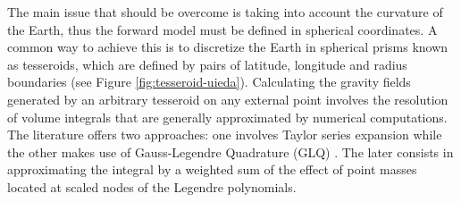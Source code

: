 \documentclass[a4paper,10pt]{article}
\begin{document}
The main issue that should be overcome is taking into account the curvature of the Earth, thus the forward model must be defined in spherical coordinates.
A common way to achieve this is to discretize the Earth in spherical prisms known as tesseroids, which are defined by pairs of latitude, longitude and radius boundaries (see Figure \ref{fig:tesseroid-uieda}).
Calculating the gravity fields generated by an arbitrary tesseroid on any external point involves the resolution of volume integrals that are generally approximated by numerical computations.
The literature offers two approaches: one involves Taylor series expansion \citep{Heck2007, Grombein2013} while the other makes use of Gauss-Legendre Quadrature (GLQ) \citep{Asgharzadeh2007, Uieda2016, Uieda2017}.
The later consists in approximating the integral by a weighted sum of the effect of point masses located at scaled nodes of the Legendre polynomials.






\end{document}
